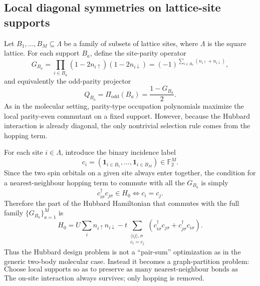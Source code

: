 \documentclass[11pt]{article}
\newcommand{\odd}{\mathrm{odd}}
\theoremstyle{definition}
\theoremstyle{remark}
\begin{document}
\subsection{Local diagonal symmetries on lattice-site supports}
Let $B_1,\dots,B_M\subseteq \Lambda$ be a family of subsets of lattice sites, where $\Lambda$ is the square lattice. For each support $B_a$, define the site-parity operator
\begin{equation}
  G_{B_a}
  =
  \prod_{i\in B_a}(1-2n_{i\uparrow})(1-2n_{i\downarrow})
  =(-1)^{\sum_{i\in B_a}(n_{i\uparrow}+n_{i\downarrow})},
\end{equation}
and equivalently the odd-parity projector
\begin{equation}
  Q_{B_a}=\Pi_{\odd}(B_a)=\frac{1-G_{B_a}}{2}.
\end{equation}
As in the molecular setting, parity-type occupation polynomials maximize the local parity-even commutant on a fixed support. However, because the Hubbard interaction is already diagonal, the only nontrivial selection rule comes from the hopping term.

For each site $i\in\Lambda$, introduce the binary incidence label
\begin{equation}
  c_i
  =
  (\mathbf 1_{i\in B_1},\dots,\mathbf 1_{i\in B_M})\in \mathbb F_2^M.
\end{equation}
Since the two spin orbitals on a given site always enter together, the condition for a nearest-neighbour hopping term to commute with all the $G_{B_a}$ is simply
\begin{equation}
  c_{i\sigma}^\dagger c_{j\sigma}\in H_0
  \iff
  c_i=c_j.
\end{equation}
Therefore the part of the Hubbard Hamiltonian that commutes with the full family $\{G_{B_a}\}_{a=1}^M$ is
\begin{equation}
  H_0
  =
  U\sum_i n_{i\uparrow}n_{i\downarrow}
  -t\sum_{\substack{\langle ij\rangle,\sigma\\ c_i=c_j}}
  \left(c_{i\sigma}^\dagger c_{j\sigma}+c_{j\sigma}^\dagger c_{i\sigma}\right).
  \label{eq:hubbard-H0}
\end{equation}
Thus the Hubbard design problem is not a ``pair-sum'' optimization as in the generic two-body molecular case. Instead it becomes a graph-partition problem:
\begin{equation}
  \boxed{\text{Choose local supports so as to preserve as many nearest-neighbour bonds as possible.}}
\end{equation}
The on-site interaction always survives; only hopping is removed.
\end{document}

